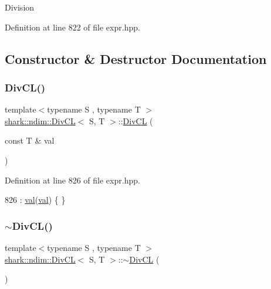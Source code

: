 Division 

Definition at line 822 of file expr.\+hpp.



\subsection{Constructor \& Destructor Documentation}
\hypertarget{classshark_1_1ndim_1_1_div_c_l_a50e01571a43ce833ad33e3d204cda6fc}{}\label{classshark_1_1ndim_1_1_div_c_l_a50e01571a43ce833ad33e3d204cda6fc} 
\subsubsection{\texorpdfstring{Div\+C\+L()}{DivCL()}}
{\footnotesize\ttfamily template$<$typename S , typename T $>$ \\
\hyperlink{classshark_1_1ndim_1_1_div_c_l}{shark\+::ndim\+::\+Div\+CL}$<$ S, T $>$\+::\hyperlink{classshark_1_1ndim_1_1_div_c_l}{Div\+CL} (\begin{DoxyParamCaption}\item[{const T \&}]{val }\end{DoxyParamCaption})\hspace{0.3cm}{\ttfamily [inline]}}



Definition at line 826 of file expr.\+hpp.


\begin{DoxyCode}
826 : \hyperlink{classshark_1_1ndim_1_1_div_c_l_af54241a85b56dd2e61b4e849b1ad1dd7}{val}(\hyperlink{classshark_1_1ndim_1_1_div_c_l_af54241a85b56dd2e61b4e849b1ad1dd7}{val}) \{ \}
\end{DoxyCode}
\hypertarget{classshark_1_1ndim_1_1_div_c_l_ac4a6d4fe77e2be99aa0f5e3596425921}{}\label{classshark_1_1ndim_1_1_div_c_l_ac4a6d4fe77e2be99aa0f5e3596425921} 
\subsubsection{\texorpdfstring{$\sim$\+Div\+C\+L()}{~DivCL()}}
{\footnotesize\ttfamily template$<$typename S , typename T $>$ \\
\hyperlink{classshark_1_1ndim_1_1_div_c_l}{shark\+::ndim\+::\+Div\+CL}$<$ S, T $>$\+::$\sim$\hyperlink{classshark_1_1ndim_1_1_div_c_l}{Div\+CL} (\begin{DoxyParamCaption}{ }\end{DoxyParamCaption})\hspace{0.3cm}{\ttfamily [inline]}}



